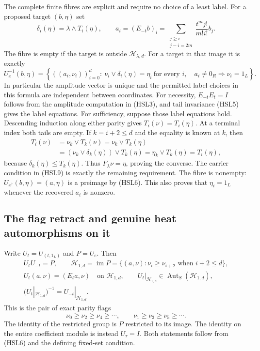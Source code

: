 The complete finite fibres are explicit and require no choice
of a least label. For a proposed target $(b,\eta)$ set
\begin{equation}\tag{HSL8}
 \delta_i(\eta)=\lambda\wedge T_i(\eta),\qquad
 a_i=(E_{-t}b)_i
      =\sum_{\substack{j\ge i\\j-i=2m}}
                   \frac{t^m j!}{m!i!}b_j .
\end{equation}
The fibre is empty if the target is outside $\mathcal H_{\lambda,d}$.
For a target in that image it is exactly
\begin{equation}\tag{HSL9}
 U_x^{-1}(b,\eta)=
 \left\{((a_i,\nu_i))_{i=0}^{d}:
 \ \nu_i\vee\delta_i(\eta)=\eta_i\ \text{for every }i,\quad
 a_i\ne0_R\Longrightarrow\nu_i=1_L\right\}.
\end{equation}
In particular the amplitude vector is unique and the permitted
label choices in this formula are independent between coordinates.
For necessity, $E_{-t}E_t=I$ follows from the amplitude computation
in (HSL3), and tail invariance (HSL5) gives the label equations.
For sufficiency, suppose those label equations hold.
Descending induction along either parity gives
$T_i(\nu)=T_i(\eta)$. At a terminal index both tails are empty.
If $k=i+2\le d$ and the equality is known at $k$, then
\[
 \begin{split}
 T_i(\nu)
 &=\nu_k\vee T_k(\nu)
  =\nu_k\vee T_k(\eta)\\
 &=(\nu_k\vee\delta_k(\eta))\vee T_k(\eta)
  =\eta_k\vee T_k(\eta)=T_i(\eta),
 \end{split}
\]
because $\delta_k(\eta)\le T_k(\eta)$.
Thus $F_\lambda\nu=\eta$, proving the converse. The carrier
condition in (HSL9) is exactly the remaining requirement.
The fibre is nonempty: $U_{x^\dagger}(b,\eta)=(a,\eta)$ is
a preimage by (HSL6). This also proves that $\eta_i=1_L$
whenever the recovered $a_i$ is nonzero.

\subsection{The flag retract and genuine heat automorphisms on it}

Write $U_t=U_{(t,1_L)}$ and $P=U_e$. Then
\begin{equation}\tag{HSL10}
 \begin{gathered}
 U_tU_{-t}=P,\qquad
 \mathcal H_{1,d}=\operatorname{im}P
       =\{(a,\nu):\nu_i\ge\nu_{i+2}\text{ when }i+2\le d\},\\
 U_t(a,\nu)=(E_ta,\nu)\quad\text{on }\mathcal H_{1,d},\qquad
 U_t|_{\mathcal H_{1,d}}\in
         \operatorname{Aut}_S(\mathcal H_{1,d}),\\
 (U_t|_{\mathcal H_{1,d}})^{-1}=U_{-t}|_{\mathcal H_{1,d}}.
 \end{gathered}
\end{equation}
This is the pair of exact parity flags
\[
 \nu_0\ge\nu_2\ge\nu_4\ge\cdots,\qquad
 \nu_1\ge\nu_3\ge\nu_5\ge\cdots.
\]
The identity of the restricted group is $P$ restricted to its
image. The identity on the entire coefficient module is instead
$U_\tau=I$. Both statements follow from (HSL6) and the defining
fixed-set condition.

